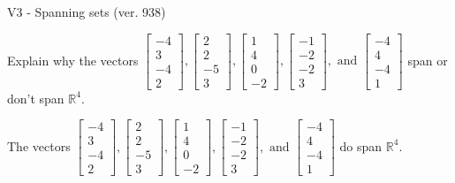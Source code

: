 \begin{exercise}
  \begin{exerciseTitle}V3 - Spanning sets (ver. 938)\end{exerciseTitle}
  \begin{exerciseStatement}
    Explain why the vectors \(\left[\begin{array}{r}
-4 \\
3 \\
-4 \\
2
\end{array}\right] , \left[\begin{array}{r}
2 \\
2 \\
-5 \\
3
\end{array}\right] , \left[\begin{array}{r}
1 \\
4 \\
0 \\
-2
\end{array}\right] , \left[\begin{array}{r}
-1 \\
-2 \\
-2 \\
3
\end{array}\right] , \text{ and } \left[\begin{array}{r}
-4 \\
4 \\
-4 \\
1
\end{array}\right]\) span or don't span \(\mathbb{R}^4\). 
	


  \end{exerciseStatement}
  \begin{exerciseAnswer}
   The vectors \(\left[\begin{array}{r}
-4 \\
3 \\
-4 \\
2
\end{array}\right] , \left[\begin{array}{r}
2 \\
2 \\
-5 \\
3
\end{array}\right] , \left[\begin{array}{r}
1 \\
4 \\
0 \\
-2
\end{array}\right] , \left[\begin{array}{r}
-1 \\
-2 \\
-2 \\
3
\end{array}\right] , \text{ and } \left[\begin{array}{r}
-4 \\
4 \\
-4 \\
1
\end{array}\right]\) 
  	 do  
	span \(\mathbb{R}^4\).
  



\end{exerciseAnswer}
\end{exercise}
